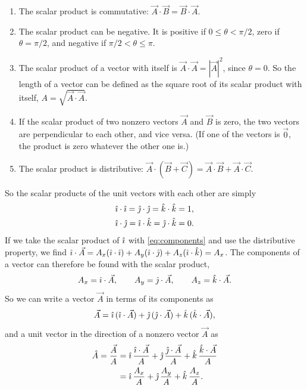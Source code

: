 \documentclass[11pt,a4paper]{article}
\begin{document}
\begin{enumerate}
  \item The scalar product is commutative: $\vec{A}\cdot\vec{B} = \vec{B}\cdot\vec{A}$.
  \item The scalar product can be negative. It is positive if $0 \le \theta < \pi/2$, zero if
    $\theta = \pi/2$, and negative if $\pi/2 < \theta \le \pi$.
  \item The scalar product of a vector with itself is $\vec{A}\cdot\vec{A} = |\vec{A}|^2$, since
    $\theta = 0$. So the length of a vector can be defined as the square root of its scalar
    product with itself, $A = \sqrt{\vec{A}\cdot\vec{A}}$.
  \item If the scalar product of two nonzero vectors $\vec{A}$ and $\vec{B}$ is zero, the two
    vectors are perpendicular to each other, and vice versa. (If one of the vectors is $\vec{0}$,
    the product is zero whatever the other one is.)
  \item The scalar product is distributive:
    $\vec{A}\cdot(\vec{B}+\vec{C}) = \vec{A}\cdot\vec{B} + \vec{A}\cdot\vec{C}$.
\end{enumerate}
So the scalar products of the unit vectors with each other are simply
\begin{equation}\label{eq:unitdots}
\begin{aligned}
  &\hat{\imath}\cdot\hat{\imath} = \hat{\jmath}\cdot\hat{\jmath} = \hat{k}\cdot\hat{k} = 1 , \\
  &\hat{\imath}\cdot\hat{\jmath} = \hat{\imath}\cdot\hat{k} = \hat{\jmath}\cdot\hat{k} = 0 .
\end{aligned}
\end{equation}
If we take the scalar product of $\hat{\imath}$ with \eqref{eq:components} and use the distributive
property, we find $\hat{\imath}\cdot\vec{A} = A_x(\hat{\imath}\cdot\hat{\imath}) + A_y(\hat{\imath}\cdot\hat{\jmath}) +
A_z(\hat{\imath}\cdot\hat{k}) = A_x$. The components of a vector can therefore be found with the scalar
product,
\begin{equation}\label{eq:compdot}
  A_x = \hat{\imath}\cdot\vec{A} , \qquad A_y = \hat{\jmath}\cdot\vec{A} , \qquad A_z = \hat{k}\cdot\vec{A} .
\end{equation}
So we can write a vector $\vec{A}$ in terms of its components as
\begin{equation}\label{eq:Aexpand}
  \vec{A} = \hat{\imath}\,(\hat{\imath}\cdot\vec{A}) + \hat{\jmath}\,(\hat{\jmath}\cdot\vec{A}) + \hat{k}\,(\hat{k}\cdot\vec{A}) ,
\end{equation}
and a unit vector in the direction of a nonzero vector $\vec{A}$ as
\begin{equation}\label{eq:Ahat}
\begin{aligned}
  \hat{A} = \frac{\vec{A}}{A} &= \hat{\imath}\,\frac{\hat{\imath}\cdot\vec{A}}{A} + \hat{\jmath}\,\frac{\hat{\jmath}\cdot\vec{A}}{A}
     + \hat{k}\,\frac{\hat{k}\cdot\vec{A}}{A} \\
  &= \hat{\imath}\,\frac{A_x}{A} + \hat{\jmath}\,\frac{A_y}{A} + \hat{k}\,\frac{A_z}{A} .
\end{aligned}
\end{equation}
\end{document}

